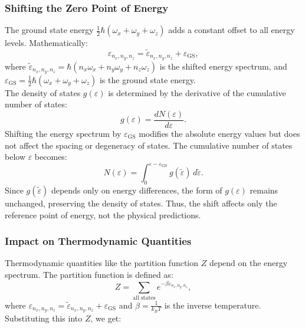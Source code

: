 \documentclass{article}
\numberwithin{equation}{section}
\numberwithin{equation}{subsection}
\begin{document}
\subsubsection{Shifting the Zero Point of Energy}
The ground state energy \( \frac{1}{2} \hbar (\omega_{\mathit{x}} + \omega_{\mathit{y}} + \omega_{\mathit{z}}) \) adds a constant offset to all energy levels. Mathematically:
\[
\varepsilon_{\mathit{n}_{\mathit{x}},\mathit{n}_{\mathit{y}},\mathit{n}_{\mathit{z}}} = \tilde{\varepsilon}_{\mathit{n}_{\mathit{x}},\mathit{n}_{\mathit{y}},\mathit{n}_{\mathit{z}}} + \varepsilon_{\text{GS}},
\]
where \( \tilde{\varepsilon}_{\mathit{n}_{\mathit{x}},\mathit{n}_{\mathit{y}},\mathit{n}_{\mathit{z}}} = \hbar (\mathit{n}_{\mathit{x}} \omega_{\mathit{x}} + \mathit{n}_{\mathit{y}} \omega_{\mathit{y}} + \mathit{n}_{\mathit{z}} \omega_{\mathit{z}}) \) is the shifted energy spectrum, and \( \varepsilon_{\text{GS}} = \frac{1}{2} \hbar (\omega_{\mathit{x}} + \omega_{\mathit{y}} + \omega_{\mathit{z}}) \) is the ground state energy.\\
The density of states \( g(\varepsilon) \) is determined by the derivative of the cumulative number of states:
\[
g(\varepsilon) = \frac{dN(\varepsilon)}{d\varepsilon}.
\]
Shifting the energy spectrum by \( \varepsilon_{\text{GS}} \) modifies the absolute energy values but does not affect the spacing or degeneracy of states. The cumulative number of states below \( \varepsilon \) becomes:
\[
N(\varepsilon) = \int_{0}^{\varepsilon - \varepsilon_{\text{GS}}} g(\tilde{\varepsilon}) \, d\tilde{\varepsilon}.
\]
Since \( g(\tilde{\varepsilon}) \) depends only on energy differences, the form of \( g(\varepsilon) \) remains unchanged, preserving the density of states. Thus, the shift affects only the reference point of energy, not the physical predictions.

\subsubsection{Impact on Thermodynamic Quantities}
Thermodynamic quantities like the partition function \( Z \) depend on the energy spectrum. The partition function is defined as:
\[
Z = \sum_{\text{all states}} e^{-\beta \varepsilon_{\mathit{n}_{\mathit{x}},\mathit{n}_{\mathit{y}},\mathit{n}_{\mathit{z}}}},
\]
where \( \varepsilon_{\mathit{n}_{\mathit{x}},\mathit{n}_{\mathit{y}},\mathit{n}_{\mathit{z}}} = \tilde{\varepsilon}_{\mathit{n}_{\mathit{x}},\mathit{n}_{\mathit{y}},\mathit{n}_{\mathit{z}}} + \varepsilon_{\text{GS}} \) and \( \beta = \frac{1}{k_B T} \) is the inverse temperature. Substituting this into \( Z \), we get:
\end{document}
